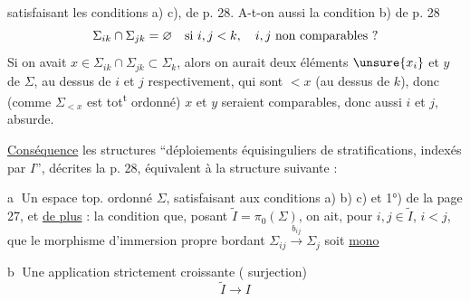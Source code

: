 satisfaisant les conditions a) c),  de p. 28.
A-t-on aussi la condition b) de p. 28
\[
\Sigma_{ik}\cap\Sigma_{jk}=\varnothing\quad\hbox{si }i,j<k,\quad
i,j\ \hbox{non comparables ?}
\]
Si on avait $x\in\Sigma_{ik}\cap\Sigma_{jk}\subset\Sigma_k$,
alors on aurait deux éléments $\unsure{x_i}$ et $y$ de $\Sigma$,
au dessus de $i$ et $j$ respectivement, qui sont $<x$
(au dessus de $k$), donc (comme $\Sigma_{<x}$ est tot\textsuperscript{t} ordonné)
 $x$ et $y$ seraient comparables, donc aussi
$i$ et $j$, absurde.

\uline{Conséquence} les structures ``déploiements
équisinguliers de stratifications, indexés par $I$'',
décrites  la p. 28, équivalent à la structure suivante :


\textcircled{a} Un \deleted{$\Sigma$} espace top. ordonné $\Sigma$,
satisfaisant aux conditions a) b) c) et 1°) de la page 27,
et \uline{de plus} : la condition que, 
posant $\widetilde I=\pi_0(\Sigma)$, on ait, pour
$i,j\in\widetilde I$, $i<j$, que le morphisme d'immersion
propre bordant $\Sigma_{ij}\xrightarrow{b_{ij}}\Sigma_j$ soit
\uline{mono}

\textcircled{b} Une application strictement croissante
( surjection)
\[
\widetilde I\longrightarrow I
\]
